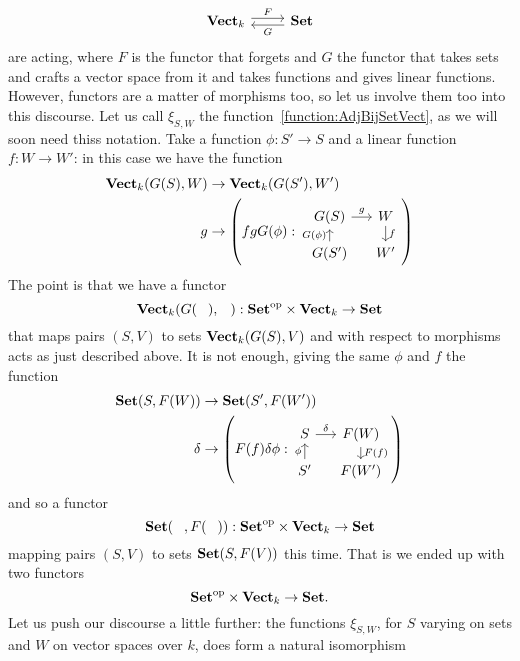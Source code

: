 \begin{example}
\[\begin{tikzcd}
\Vect_k \ar["F", r, shift left] & \Set \ar["G", l, shift left]
\end{tikzcd}\]
are acting, where \(F\) is the functor that forgets and \(G\) the functor that takes sets and crafts a vector space from it and takes functions and gives linear functions.  However, functors are a matter of morphisms too, so let us involve them too into this discourse. Let us call \(\xi_{S,W}\) the function~\eqref{function:AdjBijSetVect}, as we will soon need thiss notation.\newline
Take a function \(\phi : S' \to S\) and a linear function \(f : W \to W'\): in this case we have the function
\[\begin{aligned}
\Vect_k(G(S), W) & \to \Vect_k(G(S'), W') \\
g &\to \left(fgG(\phi) : \begin{tikzcd}[row sep=small, column sep=small, ampersand replacement=\&]
G(S) \ar["g", r] \& W \ar["f", d] \\
G(S') \ar["G(\phi)", u] \& W'
\end{tikzcd}\right)
\end{aligned}\]
The point is that we have a functor
\[\Vect_k(G(\hole), \hole) : \op\Set \times \Vect_k \to \Set\]
that maps pairs \((S, V)\) to sets \(\mathbf{Vect}_k(G(S), V)\) and with respect to morphisms acts as just described above. It is not enough, giving the same \(\phi\) and \(f\) the function
\[\begin{aligned}
\Set(S, F(W)) & \to \Set(S', F(W')) \\
\delta &\to \left(F(f)\delta\phi : \begin{tikzcd}[row sep=small, column sep=small, ampersand replacement=\&]
S \ar["\delta", r] \& F(W) \ar["F(f)", d] \\
S' \ar["\phi", u] \& F(W')
\end{tikzcd}\right)
\end{aligned}\]
and so a functor
\[\Set(\hole, F(\hole)) : \op\Set \times \Vect_k \to \Set\]
mapping pairs \((S, V)\) to sets \(\mathbf{Set}(S, F(V))\) this time. That is we ended up with two functors
\[\mathbf{Set}^\text{op} \times \mathbf{Vect}_k \to \mathbf{Set} .\]
Let us push our discourse a little further: the functions \(\xi_{S, W}\), for \(S\) varying on sets and \(W\) on vector spaces over \(k\), does form a natural isomorphism

\end{example}
